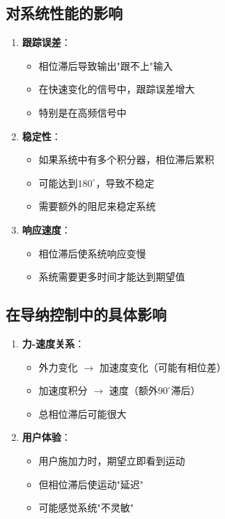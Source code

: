 \documentclass[12pt,a4paper]{article}
\begin{document}
\begin{enumerate}
\subsection{对系统性能的影响}

\begin{enumerate}
\item \textbf{跟踪误差}：
\begin{itemize}
\item 相位滞后导致输出"跟不上"输入
\item 在快速变化的信号中，跟踪误差增大
\item 特别是在高频信号中
\end{itemize}

\item \textbf{稳定性}：
\begin{itemize}
\item 如果系统中有多个积分器，相位滞后累积
\item 可能达到$180^\circ$，导致不稳定
\item 需要额外的阻尼来稳定系统
\end{itemize}

\item \textbf{响应速度}：
\begin{itemize}
\item 相位滞后使系统响应变慢
\item 系统需要更多时间才能达到期望值
\end{itemize}
\end{enumerate}

\subsection{在导纳控制中的具体影响}

\begin{enumerate}
\item \textbf{力-速度关系}：
\begin{itemize}
\item 外力变化 $\to$ 加速度变化（可能有相位差）
\item 加速度积分 $\to$ 速度（额外$90^\circ$滞后）
\item 总相位滞后可能很大
\end{itemize}

\item \textbf{用户体验}：
\begin{itemize}
\item 用户施加力时，期望立即看到运动
\item 但相位滞后使运动"延迟"
\item 可能感觉系统"不灵敏"
\end{itemize}


\end{enumerate}
\end{enumerate}
\end{document}
